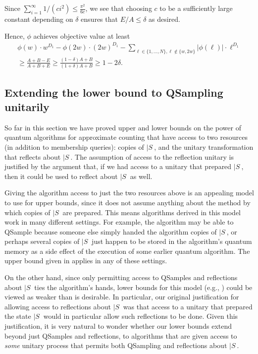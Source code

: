 Since $\sum_{i=1}^{\infty}1/(ci^2) \leq \frac{\pi^2}{6c}$, we see that
choosing $c$ to be a sufficiently large constant depending on $\delta$
ensures that $E/A \leq \delta$ as desired.

Hence, $\phi$ achieves objective value at least
\begin{align*}
\phi(w) \cdot w^{D_1} - \phi(2w) \cdot (2w)^{D_1} - \sum_{\ell \in \{1,
\dots, N\}, \ell \not\in \{w, 2w\}} |\phi(\ell)| \cdot \ell^{D_1} \\
\geq \frac{A + B - E}{A+B+E} \geq \frac{(1-\delta) A + B}{
(1+\delta)A + B} \geq 1-2\delta.
\end{align*}

%
\setcounter{subsection}{5}
\setcounter{theorem}{30}
\subsection{Extending the lower bound to QSampling unitarily}
\label{sec:unitary}
So far in this section we have proved upper and lower bounds on the power of quantum algorithms for approximate counting that have 
access to two resources (in addition to membership queries): 
copies of $|S\>$, and the unitary transformation that reflects about $|S\>$. 
The assumption of access to the reflection unitary is justified by the argument that, if we had access to a unitary that prepared $|S\>$, then it could be used to reflect about $|S\>$ as well. 

Giving the algorithm access 
to just the two resources above is an appealing model to use for upper bounds, since it does not assume anything about the method by which copies of $|S\>$ are prepared. This means algorithms
derived in this model work in many different settings.
For example, the algorithm may be able to QSample
because someone else simply handed the algorithm copies of $|S\>$, or perhaps several copies of $|S\>$ just happen to be stored in the algorithm's quantum memory as a side effect of the execution of some earlier quantum algorithm. The upper bound given
in  applies in any of these settings.


On the other hand, since only
permitting access to QSamples
and reflections about $|S\>$ ties the algorithm's hands,
lower bounds for this model
(e.g., ) could be viewed
as weaker than is desirable. 
In particular, our original 
justification
for allowing access to reflections about $|S\>$
was that access to a unitary that prepared 
the state $|S\>$ would in particular allow 
such reflections to be done. 
Given this justification, it is very natural to wonder whether 
our lower bounds extend beyond just 
QSamples and reflections, to
algorithms that are given access
to \emph{some} unitary process that 
permits both QSampling and reflections about $|S\>$. 

